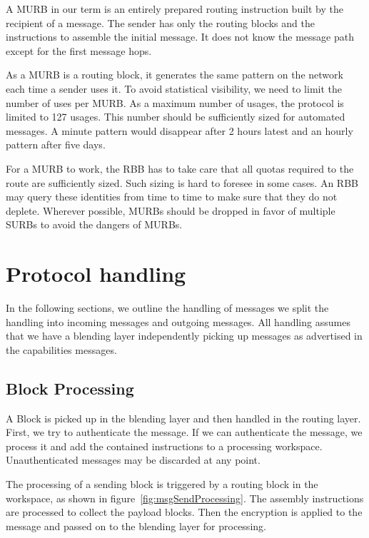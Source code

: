 A MURB in our term is an entirely prepared routing instruction built by the recipient of a message. The sender has only the routing blocks and the instructions to assemble the initial message. It does not know the message path except for the first message hops.

As a MURB is a routing block, it generates the same pattern on the network each time a sender uses it. To avoid statistical visibility, we need to limit the number of uses per MURB. As a maximum number of usages, the protocol is limited to 127 usages. This number should be sufficiently sized for automated messages. A minute pattern would disappear after 2 hours latest and an hourly pattern after five days.

For a MURB to work, the RBB has to take care that all quotas required to the route are sufficiently sized. Such sizing is hard to foresee in some cases. An RBB may query these identities from time to time to make sure that they do not deplete. Wherever possible, MURBs should be dropped in favor of multiple SURBs to avoid the dangers of MURBs.

\section{Protocol handling}
In the following sections, we outline the handling of messages we split the handling into incoming messages and outgoing messages. All handling assumes that we have a blending layer independently picking up messages as advertised in the capabilities messages.

\subsection{Block Processing}
A Block is picked up in the blending layer and then handled in the routing layer. First, we try to authenticate the message. If we can authenticate the message, we process it and add the contained instructions to a processing workspace. Unauthenticated messages may be discarded at any point.

The processing of a sending block is triggered by a routing block in the workspace, as shown in figure~\ref{fig:msgSendProcessing}. The assembly instructions are processed to collect the payload blocks. Then the encryption is applied to the message and passed on to the blending layer for processing.

